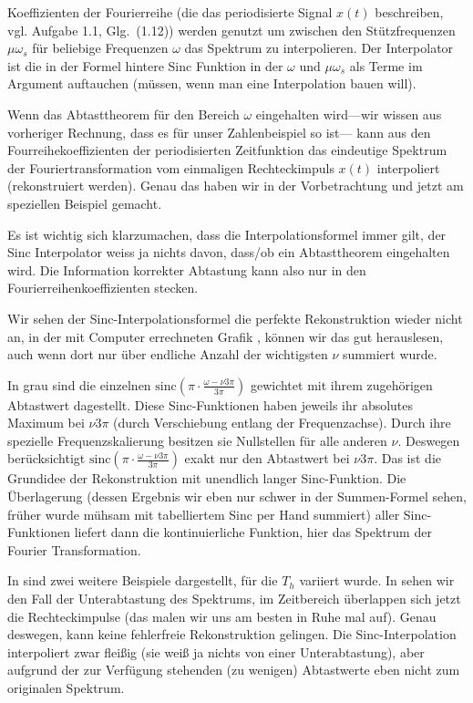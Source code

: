 \begin{Loesung}
Koeffizienten der Fourierreihe (die das periodisierte Signal $x(t)$ beschreiben, vgl. Aufgabe 1.1, Glg.~(1.12))
werden genutzt um zwischen den Stützfrequenzen
$\mu \omega_s$ für beliebige Frequenzen $\omega$ das Spektrum zu interpolieren.
Der Interpolator ist die in der Formel hintere Sinc Funktion in der $\omega$ und
$\mu \omega_s$ als Terme im Argument auftauchen (müssen, wenn man eine Interpolation bauen will).

Wenn das Abtasttheorem für den Bereich $\omega$ eingehalten wird---wir wissen aus
vorheriger Rechnung, dass es für unser Zahlenbeispiel so ist---
kann aus den Fourreihekoeffizienten der periodisierten Zeitfunktion
das eindeutige Spektrum der Fouriertransformation vom einmaligen Rechteckimpuls $x(t)$
interpoliert (rekonstruiert werden). Genau das haben wir in der Vorbetrachtung und
jetzt am speziellen Beispiel gemacht.

Es ist wichtig sich klarzumachen, dass die Interpolationsformel immer gilt,
der Sinc Interpolator weiss ja nichts davon, dass/ob ein Abtasttheorem eingehalten wird.
Die Information korrekter Abtastung kann also nur in den Fourierreihenkoeffizienten stecken.

Wir sehen der Sinc-Interpolationsformel die perfekte Rekonstruktion wieder nicht an,
in der mit Computer errechneten Grafik ,
können wir das gut herauslesen, auch wenn dort nur über endliche Anzahl der
wichtigsten $\nu$ summiert wurde.

In grau sind die einzelnen $\mathrm{sinc}(\pi\cdot\frac{\omega-\nu 3 \pi}{3\pi})$
gewichtet mit ihrem zugehörigen Abtastwert dagestellt.
Diese Sinc-Funktionen haben jeweils ihr absolutes Maximum bei $\nu 3 \pi$ (durch
Verschiebung entlang der Frequenzachse). Durch ihre spezielle Frequenzskalierung
besitzen sie Nullstellen für alle anderen $\nu$. Deswegen
berücksichtigt $\mathrm{sinc}(\pi\cdot\frac{\omega-\nu 3 \pi}{3\pi})$
exakt nur den Abtastwert bei $\nu 3 \pi$. Das ist die Grundidee der Rekonstruktion
mit unendlich langer Sinc-Funktion. Die Überlagerung (dessen Ergebnis wir eben nur schwer
in der Summen-Formel sehen, früher wurde mühsam mit tabelliertem Sinc per Hand summiert)
aller Sinc-Funktionen liefert dann die kontinuierliche Funktion,
hier das Spektrum der Fourier Transformation.



%
In  sind zwei weitere Beispiele
dargestellt, für die $T_h$ variiert wurde.
In  sehen wir den Fall der
Unterabtastung des Spektrums, im Zeitbereich überlappen sich jetzt die
Rechteckimpulse (das malen wir uns am besten in Ruhe mal auf).
Genau deswegen, kann keine fehlerfreie Rekonstruktion gelingen. Die Sinc-Interpolation
interpoliert zwar fleißig (sie weiß ja nichts von einer Unterabtastung), aber aufgrund
der zur Verfügung stehenden (zu wenigen) Abtastwerte eben nicht zum originalen Spektrum.
\end{Loesung}


